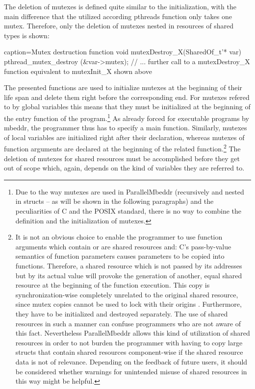 The deletion of mutexes is defined quite similar to the initialization, with the main difference that the utilized according pthreads function only takes one mutex. Therefore, only the deletion of mutexes nested in resources of shared types is shown:
\begin{ccode}{caption=Mutex destruction function}
void mutexDestroy_X(SharedOf_t'* var) { 
  pthread_mutex_destroy (&var->mutex); 
  // ... further call to a mutexDestroy_X function equivalent to mutexInit_X shown above
}
\end{ccode}
The presented functions are used to initialize mutexes at the beginning of their life span and delete them right before the corresponding end. For mutexes refered to by global variables this means that they must be initialized at the beginning of the entry function of the program.\footnote{Due to the way mutexes are used in ParallelMbeddr (recursively and nested in structs -- as will be shown in the following paragraphs) and the peculiarities of C and the POSIX standard, there is no way to combine the definition and the initialization of mutexes.} As already forced for executable programs by mbeddr, the programmer thus has to specify a main function. Similarly, mutexes of local variables are initialized right after their declaration, whereas mutexes of function arguments are declared at the beginning of the related function.\footnote{\label{mutexCopies}It is not an obvious choice to enable the programmer to use function arguments which contain or are shared resources and: C's pass-by-value semantics of function parameters causes parameters to be copied into functions. Therefore, a shared resource which is not passed by its addresses but by its actual value will provoke the generation of another, equal shared resource at the beginning of the function execution. This copy is synchronization-wise completely unrelated to the original shared resource, since mutex copies cannot be used to lock with their origins \cite{Mutexes}. Furthermore, they have to be initialized and destroyed separately. The use of shared resources in such a manner can confuse programmers who are not aware of this fact. Nevertheless ParallelMbeddr allows this kind of utilization of shared resources in order to not burden the programmer with having to copy large structs that contain shared resources component-wise if the shared resource data is not of relevance. Depending on the feedback of future users, it should be considered whether warnings for unintended misuse of shared resources in this way might be helpful.} The deletion of mutexes for shared resources must be accomplished before they get out of scope which, again, depends on the kind of variables they are referred to. 

